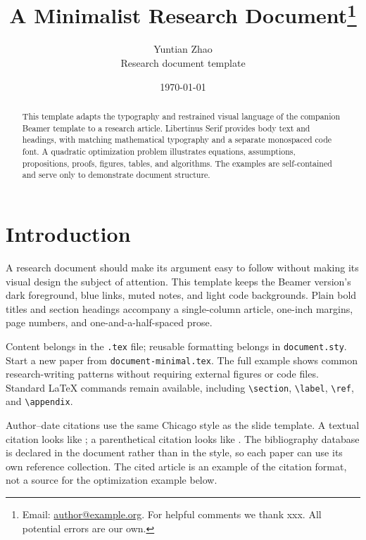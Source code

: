 \expandafter\documentclass\expandafter[\documentclassoptions]{article}
\title{A Minimalist Research Document\thanks{%
  Email: \href{mailto:author@example.org}{author@example.org}.
  For helpful comments we thank xxx. All potential errors are our own.}}
\author{Yuntian Zhao\\
  {\small\color{GitHubMuted}Research document template}}
\date{\today}
\begin{document}
\maketitle

\begin{abstract}
This template adapts the typography and restrained visual language of the
companion Beamer template to a research article. Libertinus Serif provides
body text and headings, with matching mathematical typography and a separate
monospaced code font. A quadratic optimization problem illustrates equations,
assumptions, propositions, proofs, figures, tables, and algorithms. The examples
are self-contained and serve only to demonstrate document structure.
\end{abstract}

\section{Introduction}\label{sec:introduction}

A research document should make its argument easy to follow without making
its visual design the subject of attention. This template keeps the Beamer
version's dark foreground, blue links, muted notes, and light code backgrounds.
Plain bold titles and section headings accompany a single-column article,
one-inch margins, page numbers, and one-and-a-half-spaced prose.

Content belongs in the \texttt{.tex} file; reusable formatting belongs in
\texttt{document.sty}. Start a new paper from \texttt{document-minimal.tex}.
The full example shows common research-writing patterns without requiring
external figures or code files. Standard \LaTeX{} commands remain available,
including \verb|\section|, \verb|\label|, \verb|\ref|, and \verb|\appendix|.

Author--date citations use the same Chicago style as the slide template.
A textual citation looks like \textcite{melitz_impact_2003}; a parenthetical
citation looks like \parencite{melitz_impact_2003}. The bibliography database
is declared in the document rather than in the style, so each paper can use
its own reference collection. The cited article is an example of the citation
format, not a source for the optimization example below.
\end{document}
